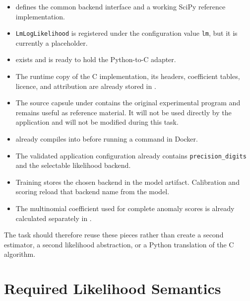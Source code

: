 \documentclass[11pt,a4paper]{article}
\begin{document}
\begin{itemize}

\item {} defines the common
backend interface and a working SciPy reference implementation.

\item \texttt{LmLogLikelihood} is registered under the configuration value
\texttt{lm}, but it is currently a placeholder.

\item {} exists and is ready to hold
the Python-to-C adapter.

\item The runtime copy of the C implementation, its headers, coefficient
tables, licence, and attribution are already stored in
.

\item The source capsule under  contains the original
experimental program and remains useful as reference material. It will not be
used directly by the application and will not be modified during this task.

\item {} already compiles
 into  before running a command in
Docker.

\item The validated application configuration already contains
\texttt{precision\_digits} and the selectable likelihood backend.

\item Training stores the chosen backend in the model artifact. Calibration
and scoring reload that backend name from the model.

\item The multinomial coefficient used for complete anomaly scores is already
calculated separately in
.

\end{itemize}

The task should therefore reuse these pieces rather than create a second
estimator, a second likelihood abstraction, or a Python translation of the C
algorithm.

\section{Required Likelihood Semantics}
\end{document}
